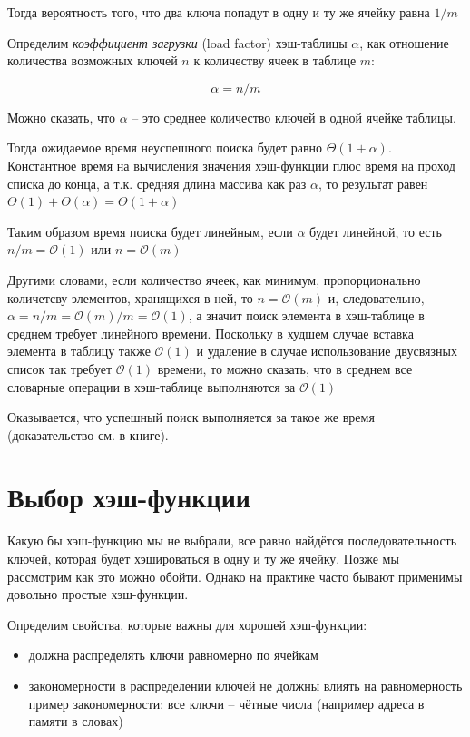 \documentclass[a4paper,11pt]{article}
\begin{document}
Тогда вероятность того, что два ключа попадут в одну и ту же ячейку равна $1/m$

Определим \emph{коэффициент загрузки} (load factor) хэш-таблицы $\alpha$, как
отношение количества возможных ключей $n$ к количеству ячеек в таблице $m$:

$$
\alpha = n / m
$$

Можно сказать, что $\alpha$ -- это среднее количество ключей в одной ячейке таблицы.

Тогда ожидаемое время неуспешного поиска будет равно $\Theta(1 + \alpha)$.
Константное время на вычисления значения хэш-функции плюс время на проход списка
до конца, а т.к. средняя длина массива как раз $\alpha$, то результат равен
$\Theta(1) + \Theta(\alpha) = \Theta(1 + \alpha)$

Таким образом время поиска будет линейным, если $\alpha$ будет линейной, то есть
$n / m = \mathcal{O}(1)$ или $n = \mathcal{O}(m)$

Другими словами, если количество ячеек, как минимум, пропорционально количетсву
элементов, хранящихся в ней, то $n = \mathcal{O}(m)$ и, следовательно, $\alpha
= n/m = \mathcal{O}(m)/m = \mathcal{O}(1)$, а значит поиск элемента в
хэш-таблице в среднем требует линейного времени. Поскольку в худшем случае
вставка элемента в таблицу также $\mathcal{O}(1)$ и удаление в случае
использование двусвязных список так требует $\mathcal{O}(1)$ времени, то можно
сказать, что в среднем все словарные операции в хэш-таблице выполняются за
$\mathcal{O}(1)$

Оказывается, что успешный поиск выполняется за такое же время (доказательство
см. в книге).

\section{Выбор хэш-функции}

Какую бы хэш-функцию мы не выбрали, все равно найдётся последовательность
ключей, которая будет хэшироваться в одну и ту же ячейку. Позже мы рассмотрим
как это можно обойти. Однако на практике часто бывают применимы довольно простые
хэш-функции.

Определим свойства, которые важны для хорошей хэш-функции:

\begin{itemize}
\item должна распределять ключи равномерно по ячейкам
\item закономерности в распределении ключей не должны влиять на равномерность \\
  пример закономерности: все ключи -- чётные числа (например адреса в памяти в
  словах)
\end{itemize}
\end{document}
